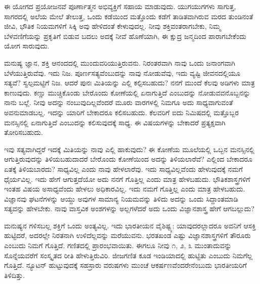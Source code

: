 \vskip 2pt

ಈ ಯೋಗದ ಪ್ರಯೋಜನವೆ ಪೂರ್ಣಾತ್ಮನ ಅಭಿವ್ಯಕ್ತಿಗೆ ಸಹಾಯ ಮಾಡುವುದು. ಯುಗಯುಗಗಳು ಸಾಗುತ್ತ, ಸಾಗರದಲ್ಲಿ ಅಲೆಯ ಮೇಲೆ ತೇಲುತ್ತ, ಒಂದು ಕಡೆಯಿಂದ ಮತ್ತೊಂದು ಕಡೆಗೆ ತಾಡಿತವಾಗಿರುವ ಮರದ ತುಂಡಿನಂತೆ ಜೀವಿ, ಭೌತಿಕ ನಿಯಮಗಳಿಗೆ ಸಿಕ್ಕಿ ಅವು ಹೇಳಿದಂತೆ ಕೇಳುವುದಲ್ಲ. ನೀವು ಶಕ್ತಿವಂತರಾಗಬೇಕು, ನಿಮ್ಮ ಬೆಳವಣಿಗೆಯನ್ನು ಪ್ರಕೃತಿಗೆ ಬಿಡುವ ಬದಲು ಅದಕ್ಕೆ ನೀವೆ ಹೊಣೆಯಾಗಿ, ಈ ಕ್ಷುದ್ರ ಜನ್ಮದಿಂದ ಪಾರಾಗಬೇಕೆಂದು ಯೋಗ ಸಾರುವುದು.

\vskip 2pt

ಮನುಷ್ಯ ಜ್ಞಾನ, ಶಕ್ತಿ ಆನಂದದಲ್ಲಿ ಮುಂದುವರಿಯುತ್ತಿರುವನು. ನಿರಂತರವಾಗಿ ನಾವು ಒಂದು ಜನಾಂಗವಾಗಿ ಬೆಳೆಯುತ್ತಿರುವೆವು. ಇದು ನಿಜ. ಪೂರ್ಣಸತ್ಯವೆಂಬುದನ್ನು ನಾವು ನೋಡುವೆವು, ಇದು ವ್ಯಷ್ಟಿ ಜೀವನದಲ್ಲಿಯೂ ಸತ್ಯವೆ? ಸ್ವಲ್ಪಮಟ್ಟಿಗೆ ನಿಜ. ಆದರೆ ಪುನಃ ಮಿತಿಯನ್ನು ಎಲ್ಲಿ ಕಲ್ಪಿಸಬಹುದು? ನನಗೆ ಮುಂದೆ ಕೆಲವು ಅಡಿಗಳು ಮಾತ್ರ ಕಾಣುವುದು. ಕಣ್ಣು ಮುಚ್ಚಿಕೊಂಡು ಬೇರೊಂದು ಕೋಣೆಯಲ್ಲಿ ಏನಾಗುತ್ತಿದೆ ಎಂಬುದನ್ನು ನೋಡುವವನೊಬ್ಬನನ್ನು ನಾನು ಬಲ್ಲೆ. ನೀವು ಅದನ್ನು ನಂಬುವುದಿಲ್ಲವೆಂದರೆ ಮೂರು ವಾರಗಳಲ್ಲಿ ನಿಮಗೂ ಅದು ಸಾಧ್ಯವಾಗುವಂತೆ ಅವನು\break ಮಾಡಬಲ್ಲ. ಇದನ್ನು ಯಾರಿಗೆ ಬೇಕಾದರೂ ಕಲಿಸಬಹುದು. ಕೆಲವರಿಗೆ ಐದು ನಿಮಿಷದಲ್ಲಿ ಮತ್ತೊಬ್ಬರ ಮನಸ್ಸಿನಲ್ಲಿ ಏನಾಗುತ್ತಿದೆ ಎಂಬುದನ್ನು ಕಲಿಸುವುದಕ್ಕೆ ಸಾಧ್ಯ. ಈ ವಿಷಯಗಳನ್ನು ಬೇಕಾದರೆ ಪ್ರತ್ಯಕ್ಷವಾಗಿ ತೋರಿಸಬಹುದು.

\vskip 2pt

ಇವು ಸತ್ಯವಾಗಿದ್ದರೆ ಇದಕ್ಕೆ ಮಿತಿಯನ್ನು ನಾವು ಎಲ್ಲಿ ಹಾಕುವುದು? ಈ ಕೋಣೆಯ ಮೂಲೆಯಲ್ಲಿ ಒಬ್ಬನ ಮನಸ್ಸಿನಲ್ಲಿ ಆಗುತ್ತಿರುವುದನ್ನು ತಿಳಿಯಬಹುದಾದರೆ ಬೇರೊಂದು ಕೋಣೆಯಿಂದ ಅದನ್ನು ತಿಳಿಯಲಾರೆವೆ? ಎಲ್ಲಿಂದ ಬೇಕಾದರೂ ಏತಕ್ಕೆ ತಿಳಿಯಬಾರದು? ಸಾಧ್ಯವಿಲ್ಲ ಎಂದು ನಾವು ಹೇಳಲಾರೆವು. ಇದು ಸಾಧ್ಯವಿಲ್ಲವೆಂದು ಹೇಳುವುದಕ್ಕೆ ನಮಗೆ ಧೈರ್ಯವಿಲ್ಲ. ಇದು ಹೇಗೆ ಆಗುತ್ತದೆಯೋ ಅದು ನನಗೆ ಗೊತ್ತಿಲ್ಲ ಎಂದು ಮಾತ್ರ ಹೇಳಬಹುದು. ಭೌತಿಕಶಾಸ್ತ್ರಗಳಿಗೆ ಇಂತಹ ವಿಷಯ ಅಸಾಧ್ಯವೆಂದು ಹೇಳಲು ಅಧಿಕಾರವಿಲ್ಲ. ಇದು ನಮಗೆ ಗೊತ್ತಿಲ್ಲ ಎಂದು ಮಾತ್ರ ಹೇಳಬಹುದು. ವಿಜ್ಞಾನವು ಘಟನೆಗಳನ್ನು ಆಯ್ದು ಅವುಗಳ ಸಾಮಾನ್ಯ ನಿಯಮವನ್ನು ತಿಳಿದು ಅದನ್ನು ಒಂದು ಸಿದ್ದಾಂತಮಾಡಿ ಸತ್ಯವನ್ನು ಹೇಳಬೇಕು. ನಾವು ವಾಸ್ತವಿಕ ಅಂಶಗಳನ್ನು ಅಲ್ಲಗಳೆದರೆ ಅದು ಒಂದು ವಿಜ್ಞಾನಶಾಸ್ತ್ರ ಹೇಗೆ ಆಗಬಲ್ಲುದು?

\vskip 2pt

ಮನುಷ್ಯನ ಗಳಿಸಬಲ್ಲ ಶಕ್ತಿಗೆ ಒಂದು ಅಂತ್ಯವಿಲ್ಲ. ಇದು ಭಾರತೀಯನ ವೈಶಿಷ್ಟ್ಯ: ಯಾವುದರಲ್ಲಾದರೂ ಅವನಿಗೆ ಆಸಕ್ತಿ ಹುಟ್ಟಿದರೆ, ಅದರಲ್ಲೇ ನಿರತನಾಗಿ ಉಳಿದೆಲ್ಲವನ್ನು ಮರೆಯುವನು. ಭರತಖಂಡ ಎಷ್ಟು ವಿಜ್ಞಾನಶಾಸ್ತ್ರಗಳಿಗೆ ತೌರೂರು ಎಂಬುದು ನಿಮಗೆ ಗೊತ್ತಿದೆ. ಗಣಿತದಲ್ಲಿ ಪ್ರಾರಂಭವಾಯಿತು. ಈಗಲೂ ನೀವು ೧, ೨, ೩ ಮುಂತಾದುವನ್ನು ಸೊನ್ನೆಯವರೆಗೆ ಸಂಸ್ಕೃತದ ರೀತಿ ಹೇಳುತ್ತಿರುವಿರಿ. ಜೀಜಗಣಿತ ಕೂಡ ಇಂಡಿಯಾದಲ್ಲಿ ಹುಟ್ಟಿತು ಎಂಬುದು ನಿಮಗೆಲ್ಲ ಗೊತ್ತಿದೆ. ನ್ಯೂಟನ್ ಹುಟ್ಟುವುದಕ್ಕೆ ಸಹಸ್ರಾರು ವರುಷಗಳು ಮುಂಚೆ ಆಕರ್ಷಣವೆಂದರೇನೆಂಬುದು ಭಾರತೀಯರಿಗೆ ತಿಳಿದಿತ್ತು.

